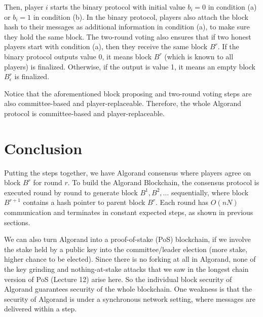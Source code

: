 \documentclass{article}
\begin{document}
Then, player $i$ starts the binary protocol with initial value $b_i=0$ in condition (a) or $b_i=1$ in condition (b). In the binary protocol, players also attach the block hash to their messages as additional information in condition (a), to make sure they hold the same block. The two-round voting also ensures that if two honest players start with condition (a), then they receive the same block $B^r$. If the binary protocol outputs value 0, it means block $B^r$ (which is known to all players) is finalized. Otherwise, if the output is value 1, it means an empty block $B^r_{\epsilon}$ is finalized.

Notice that the aforementioned block proposing and two-round voting steps are also committee-based and player-replaceable. Therefore, the whole Algorand protocol is committee-based and player-replaceable.


\section*{Conclusion}

Putting the steps together, we have Algorand consensus where players agree on block $B^r$ for round $r$. To build the Algorand Blockchain, the consensus protocol is executed round by round to generate block $B^1,B^2,\ldots$ sequentially, where block $B^{r+1}$ contains a hash pointer to parent block $B^r$. Each round has $O(nN)$ communication and terminates in constant expected steps, as shown in previous sections.

We can also turn Algorand into a proof-of-stake (PoS) blockchain, if we involve the stake held by a public key into the committee/leader election (more stake, higher chance to be elected).%
Since there is no forking at all in Algorand,  none of the key grinding and nothing-at-stake attacks that we saw in the longest chain version of PoS (Lecture 12) arise here. So the individual block security of Algorand guarantees security of the whole blockchain. 
One weakness is that the security of Algorand is under a synchronous network setting, where messages are delivered within a step. 
\end{document}
